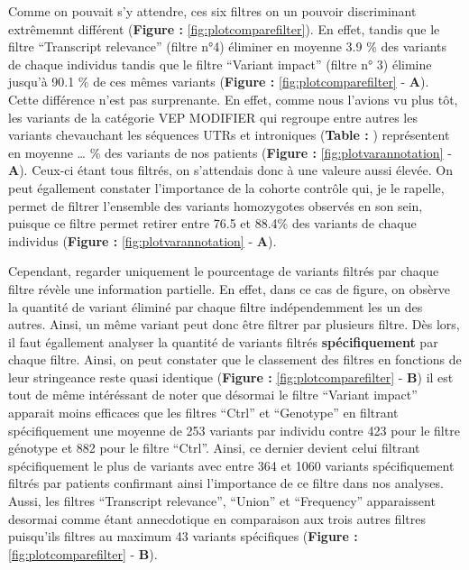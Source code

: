 \documentclass[12pt,twoside]{reedthesis}
\theoremstyle{definition}
\theoremstyle{definition}
\theoremstyle{remark}
\begin{document}
  \newpage
  
  \newpage
  
  Comme on pouvait s'y attendre, ces six filtres on un pouvoir
  discriminant extrêmemnt différent (\textbf{Figure :}
  \ref{fig:plotcomparefilter}). En effet, tandis que le filtre
  ``Transcript relevance'' (filtre n°4) éliminer en moyenne 3.9 \% des
  variants de chaque individus tandis que le filtre ``Variant impact''
  (filtre n° 3) élimine jusqu'à 90.1 \% de ces mêmes variants
  (\textbf{Figure :} \ref{fig:plotcomparefilter} - \textbf{A}). Cette
  différence n'est pas surprenante. En effet, comme nous l'avions vu plus
  tôt, les variants de la catégorie VEP MODIFIER qui regroupe entre autres
  les variants chevauchant les séquences UTRs et introniques
  (\textbf{Table :} ) représentent en moyenne \ldots{} \% des variants de
  nos patients (\textbf{Figure :} \ref{fig:plotvarannotation} -
  \textbf{A}). Ceux-ci étant tous filtrés, on s'attendais donc à une
  valeure aussi élevée. On peut égallement constater l'importance de la
  cohorte contrôle qui, je le rapelle, permet de filtrer l'ensemble des
  variants homozygotes observés en son sein, puisque ce filtre permet
  retirer entre 76.5 et 88.4\% des variants de chaque individus
  (\textbf{Figure :} \ref{fig:plotvarannotation} - \textbf{A}).
  
  Cependant, regarder uniquement le pourcentage de variants filtrés par
  chaque filtre révèle une information partielle. En effet, dans ce cas de
  figure, on obsèrve la quantité de variant éliminé par chaque filtre
  indépendemment les un des autres. Ainsi, un même variant peut donc être
  filtrer par plusieurs filtre. Dès lors, il faut égallement analyser la
  quantité de variants filtrés \textbf{spécifiquement} par chaque filtre.
  Ainsi, on peut constater que le classement des filtres en fonctions de
  leur stringeance reste quasi identique (\textbf{Figure :}
  \ref{fig:plotcomparefilter} - \textbf{B}) il est tout de même
  intéréssant de noter que désormai le filtre ``Variant impact'' apparait
  moins efficaces que les filtres ``Ctrl'' et ``Genotype'' en filtrant
  spécifiquement une moyenne de 253 variants par individu contre 423 pour
  le filtre génotype et 882 pour le filtre ``Ctrl''. Ainsi, ce dernier
  devient celui filtrant spécifiquement le plus de variants avec entre 364
  et 1060 variants spécifiquement filtrés par patients confirmant ainsi
  l'importance de ce filtre dans nos analyses. Aussi, les filtres
  ``Transcript relevance'', ``Union'' et ``Frequency'' apparaissent
  desormai comme étant annecdotique en comparaison aux trois autres
  filtres puisqu'ils filtres au maximum 43 variants spécifiques
  (\textbf{Figure :} \ref{fig:plotcomparefilter} - \textbf{B}).
  
\end{document}
